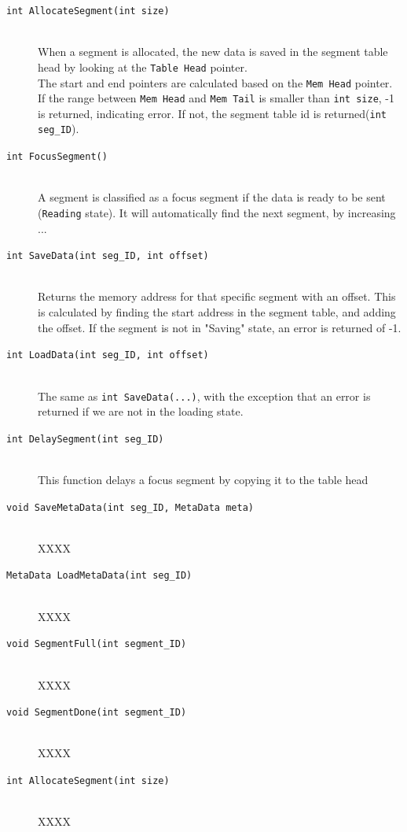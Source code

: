 \begin{description}
  \item[\texttt{int AllocateSegment(int size)}]\hfill\\
  When a segment is allocated, the new data is saved in the segment table
  head by looking at the \texttt{Table Head} pointer.\\
  The start and end pointers are calculated based on the \texttt{Mem Head}
  pointer. If the range between \texttt{Mem Head} and \texttt{Mem Tail} is
  smaller than \texttt{int size}, -1 is returned, indicating
  error. If not, the segment table id is
  returned(\texttt{int seg_ID}).

  \item[\texttt{int FocusSegment()}]\hfill\\
  A segment is classified as a focus segment if the data is ready to be sent
  (\texttt{Reading} state). It will automatically find the next segment, by
  increasing ... 

  \item[\texttt{int SaveData(int seg_ID, int offset)}]\hfill\\
  Returns the memory address for that specific segment with an offset.
  This is calculated by finding the start address in the segment table, and
  adding the offset. If the segment is not in "Saving" state, an error
  is returned of -1.

  \item[\texttt{int LoadData(int seg_ID, int offset)}]\hfill\\
  The same as \texttt{int SaveData(...)}, with the exception
  that an error is returned if we are not in the loading state.

  \item[\texttt{int DelaySegment(int seg_ID)}]\hfill\\
  This function delays a focus segment by copying it to the table head

  \item[{\texttt{void SaveMetaData(int seg_ID, MetaData meta)}}]\hfill\\
  XXXX

  \item[\texttt{MetaData LoadMetaData(int seg_ID)}]\hfill\\
  XXXX
  \item[\texttt{void SegmentFull(int segment_ID)}]\hfill\\
  XXXX

  \item[\texttt{void SegmentDone(int segment_ID)}]\hfill\\
  XXXX

  \item[\texttt{int AllocateSegment(int size)}]\hfill\\
  XXXX
\end{description}


